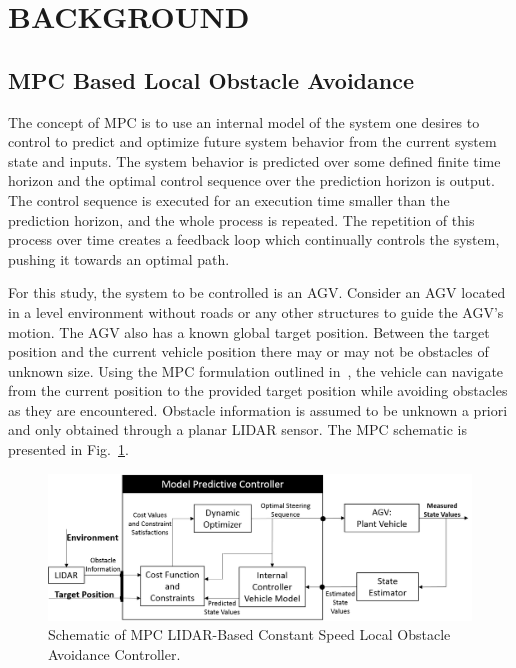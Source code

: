 \documentclass[12pt,twocolumn]{article}
\begin{document}

\section{BACKGROUND}\label{s:background}

\subsection{MPC Based Local Obstacle Avoidance }\label{ss:MPC}
The concept of MPC is to use an internal model of the system one desires to control to predict and optimize future system behavior from the current system state and inputs. The system behavior is predicted over some defined finite time horizon and the optimal control sequence over the prediction horizon is output. The control sequence is executed for an execution time smaller than the prediction horizon, and the whole process is repeated. The repetition of this process over time creates a feedback loop which continually controls the system, pushing it towards an optimal path.

For this study, the system to be controlled is an AGV. Consider an AGV located in a level environment without roads or any other structures to guide the AGV’s motion. The AGV also has a known global target position. Between the target position and the current vehicle position there may or may not be obstacles of unknown size. Using the MPC formulation outlined in~\cite{ModelFidelity2016}, the vehicle can navigate from the current position to the provided target position while avoiding obstacles as they are encountered. Obstacle information is assumed to be unknown a priori and only obtained through a planar LIDAR sensor. The MPC schematic is presented in Fig.~\ref{fig:MPC_schematic}.
%
\begin{figure}
	\centering
	\includegraphics[width=\columnwidth]{Figs/MPCBlockDiagram.png}
	\caption{\small Schematic of MPC LIDAR-Based Constant Speed Local Obstacle Avoidance Controller.  }    
	\label{fig:MPC_schematic}
\end{figure}
\end{document}
